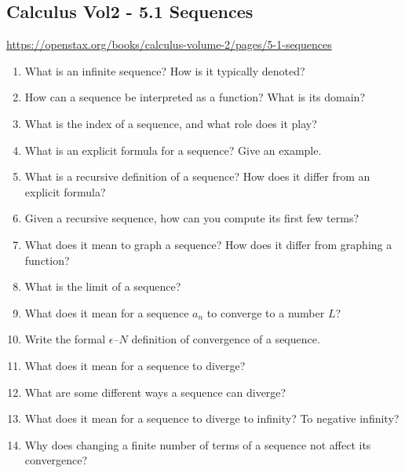 \subsection{Calculus Vol2 - 5.1 Sequences}

\url{https://openstax.org/books/calculus-volume-2/pages/5-1-sequences}

\begin{enumerate}

\item What is an infinite sequence? How is it typically denoted?

\item How can a sequence be interpreted as a function? What is its domain?

\item What is the index of a sequence, and what role does it play?

\item What is an explicit formula for a sequence? Give an example.

\item What is a recursive definition of a sequence? How does it differ from an explicit formula?

\item Given a recursive sequence, how can you compute its first few terms?

\item What does it mean to graph a sequence? How does it differ from graphing a function?

\item What is the limit of a sequence?

\item What does it mean for a sequence ${a_n}$ to converge to a number $L$?

\item Write the formal $\epsilon$–$N$ definition of convergence of a sequence.

\item What does it mean for a sequence to diverge?

\item What are some different ways a sequence can diverge?

\item What does it mean for a sequence to diverge to infinity? To negative infinity?

\item Why does changing a finite number of terms of a sequence not affect its convergence?


\end{enumerate}
